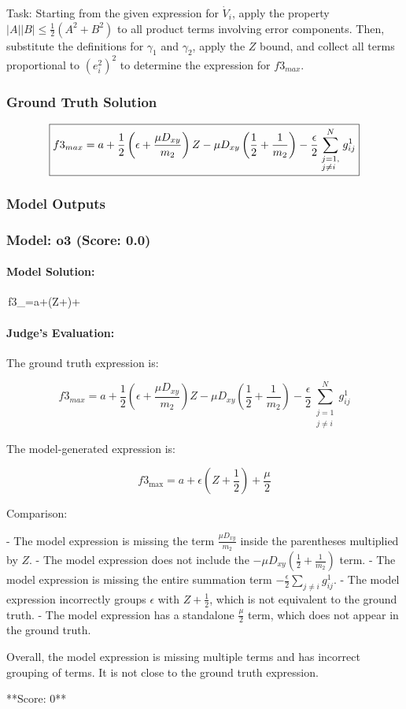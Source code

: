 \documentclass[10pt]{article}
\begin{document}
Task:
Starting from the given expression for $\dot V_i$, apply the property $\left| A \right|\left| B \right| \le \frac{1}{2}\left( {{A^2} + {B^2}} \right)$ to all product terms involving error components. Then, substitute the definitions for $\gamma_1$ and $\gamma_2$, apply the $Z$ bound, and collect all terms proportional to ${\left( {e_i^2} \right)^2}$ to determine the expression for $f3_{max}$.

\subsubsection*{Ground Truth Solution}
\[ \boxed{f3_{max} = a + \frac{1}{2}\left( {\epsilon  + \frac{{\mu {D_{xy}}}}{{{m_2}}}} \right)Z - \mu {D_{xy}}\left( {\frac{1}{2} + \frac{1}{{{m_2}}}} \right) - \frac{\epsilon }{2}\sum\limits_{\scriptstyle j = 1,\hfill\atop \scriptstyle j \ne i\hfill}^N {g_{ij}^1}} \]

\subsubsection*{Model Outputs}
\subsubsection*{Model: o3 (Score: 0.0)}
\paragraph*{Model Solution:}
\,f3_{\max}=a+\epsilon\!\left(Z+\right)+\,

\paragraph*{Judge's Evaluation:}

The ground truth expression is:

\[
f3_{max} = a + \frac{1}{2}\left( \epsilon + \frac{\mu D_{xy}}{m_2} \right) Z - \mu D_{xy} \left( \frac{1}{2} + \frac{1}{m_2} \right) - \frac{\epsilon}{2} \sum_{\substack{j=1 \\ j \neq i}}^N g_{ij}^1
\]

The model-generated expression is:

\[
f3_{\max} = a + \epsilon \left( Z + \frac{1}{2} \right) + \frac{\mu}{2}
\]

Comparison:

- The model expression is missing the term \(\frac{\mu D_{xy}}{m_2}\) inside the parentheses multiplied by \(Z\).
- The model expression does not include the \(- \mu D_{xy} \left( \frac{1}{2} + \frac{1}{m_2} \right)\) term.
- The model expression is missing the entire summation term \(- \frac{\epsilon}{2} \sum_{j \neq i} g_{ij}^1\).
- The model expression incorrectly groups \(\epsilon\) with \(Z + \frac{1}{2}\), which is not equivalent to the ground truth.
- The model expression has a standalone \(\frac{\mu}{2}\) term, which does not appear in the ground truth.

Overall, the model expression is missing multiple terms and has incorrect grouping of terms. It is not close to the ground truth expression.

**Score: 0**

\newpage
\end{document}
